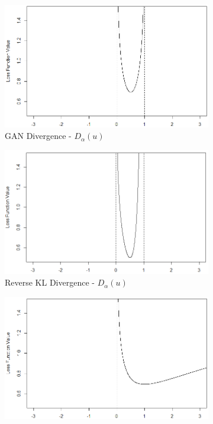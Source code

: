 \documentclass[honours,12pt, twoside]{unswthesis}
\numberwithin{equation}{section}
\theoremstyle{definition}
\begin{document}
\begin{figure}[h!]
\begin{subfigure}{0.49\textwidth}
\includegraphics[width=\linewidth]{ADVD.png}
\caption{GAN Divergence - $D_\alpha(u)$}
\end{subfigure}
\begin{subfigure}{0.49\textwidth}
\includegraphics[width=\linewidth]{KLD.png}
\caption{Reverse KL Divergence - $D_\alpha(u)$}
\end{subfigure}
\begin{subfigure}{0.49\textwidth}
\includegraphics[width=\linewidth]{ADVR.png}

\end{subfigure}
\end{figure}
\end{document}
